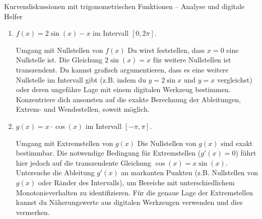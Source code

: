 \begin{aufgabenumgebung}{Kurvendiskussionen mit trigonometrischen Funktionen – Analyse und digitale Helfer}
\begin{enumerate}
    \item $f(x) = 2\sin(x) - x$ im Intervall $[0, 2\pi]$.
        \begin{tippumgebung}{Umgang mit Nullstellen von $f(x)$}
        Du wirst feststellen, dass $x=0$ eine Nullstelle ist. Die Gleichung $2\sin(x) = x$ für weitere Nullstellen ist transzendent. Du kannst grafisch argumentieren, dass es eine weitere Nullstelle im Intervall gibt (z.B. indem du $y=2\sin x$ und $y=x$ vergleichst) oder deren ungefähre Lage mit einem digitalen Werkzeug bestimmen. Konzentriere dich ansonsten auf die exakte Berechnung der Ableitungen, Extrem- und Wendestellen, soweit möglich.
        \end{tippumgebung}
    \item $g(x) = x \cdot \cos(x)$ im Intervall $[-\pi, \pi]$.
        \begin{tippumgebung}{Umgang mit Extremstellen von $g(x)$}
        Die Nullstellen von $g(x)$ sind exakt bestimmbar. Die notwendige Bedingung für Extremstellen ($g'(x)=0$) führt hier jedoch auf die transzendente Gleichung $\cos(x) = x\sin(x)$. Untersuche die Ableitung $g'(x)$ an markanten Punkten (z.B. Nullstellen von $g(x)$ oder Ränder des Intervalls), um Bereiche mit unterschiedlichem Monotonieverhalten zu identifizieren. Für die genaue Lage der Extremstellen kannst du Näherungswerte aus digitalen Werkzeugen verwenden und dies vermerken.
        \end{tippumgebung}
\end{enumerate}
\end{aufgabenumgebung}


